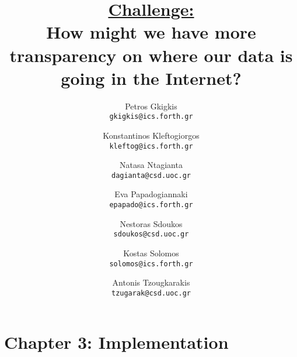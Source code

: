 \documentclass[11pt, a4paper]{article}
\title{\Large \bf \underline{Challenge:}\\
How might we have more transparency on where our data is going in the Internet?\\}
\author{
	Petros Gkigkis\\
	\texttt{gkigkis@ics.forth.gr}\\
	\and
  	Konstantinos Kleftogiorgos\\
	\texttt{kleftog@ics.forth.gr}\\
	\and
	Natasa Ntagianta\\
	\texttt{dagianta@csd.uoc.gr}\\
  	\and
	Eva Papadogiannaki\\
  	\texttt{epapado@ics.forth.gr}\\
	\and
	Nestoras Sdoukos\\
	\texttt{sdoukos@csd.uoc.gr}\\
	\and
	Kostas Solomos\\
	\texttt{solomos@ics.forth.gr}\\
	\and
	Antonis Tzougkarakis\\
	\texttt{tzugarak@csd.uoc.gr}\\
}
\date{}
\begin{document}
	\maketitle
	\newpage

	
	
	
	
	
	\section{Chapter 3: Implementation}
	
	
%	
%	
%	
%	
%	
%	
%	
%	
%	
	
\end{document}
